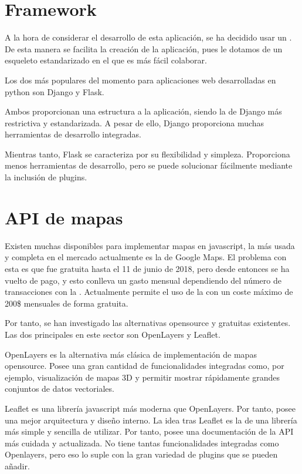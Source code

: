  \section{Framework}
    A la hora de considerar el desarrollo de esta aplicación, se ha decidido usar un . De esta manera se facilita la creación de la aplicación, pues le dotamos de un esqueleto estandarizado en el que es más fácil colaborar.
    
    Los dos  más populares del momento para aplicaciones web desarrolladas en python son Django\cite{django} y Flask\cite{flask}.
    
    Ambos proporcionan una estructura a la aplicación, siendo la de Django más restrictiva y estandarizada. A pesar de ello, Django proporciona muchas herramientas de desarrollo integradas.
    
    Mientras tanto, Flask se caracteriza por su flexibilidad y simpleza. Proporciona menos herramientas de desarrollo, pero se puede solucionar fácilmente mediante la inclusión de plugins.
    
  
  \section{API de mapas}
  
    Existen muchas  disponibles para implementar mapas en javascript, la más usada y completa en el mercado actualmente es la de Google Maps\cite{gmaps}. El problema con esta  es que fue gratuita hasta el 11 de junio de 2018, pero desde entonces se ha vuelto de pago, y esto conlleva un gasto mensual dependiendo del número de transacciones con la . Actualmente permite el uso de la  con un coste máximo de 200\$ mensuales de forma gratuita.
    
    
    Por tanto, se han investigado las alternativas opensource y gratuitas existentes. Las dos  principales en este sector son OpenLayers\cite{openlayers} y Leaflet\cite{leaflet}.
    
    OpenLayers es la alternativa más clásica de implementación de mapas opensource. Posee una gran cantidad de funcionalidades integradas como, por ejemplo, visualización de mapas 3D y permitir mostrar rápidamente grandes conjuntos de datos vectoriales.
    
    Leaflet es una librería javascript más moderna que OpenLayers. Por tanto, posee una mejor arquitectura y diseño interno. La idea tras Leaflet es la de una librería más simple y sencilla de utilizar. Por tanto, posee una documentación de la API más cuidada y actualizada. No tiene tantas funcionalidades integradas como Openlayers, pero eso lo suple con la gran variedad de plugins que se pueden añadir.
    
